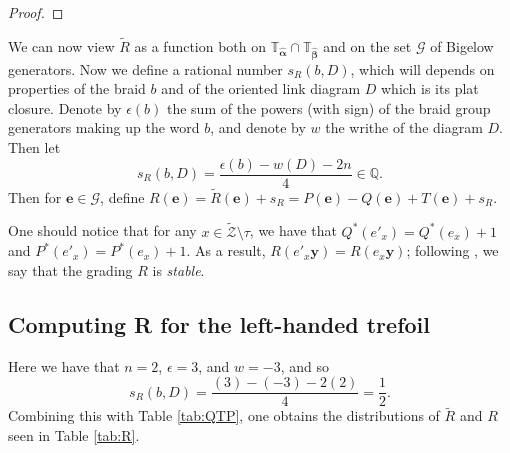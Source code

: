 \documentclass[11pt]{article}
\theoremstyle{plain} \newtheorem{thm}{Theorem}[subsection]
\theoremstyle{plain} \newtheorem{cor}[thm]{Corollary}
\theoremstyle{plain} \newtheorem{prop}[thm]{Proposition}
\theoremstyle{plain} \newtheorem{conj}[thm]{Conjecture}
\theoremstyle{plain} \newtheorem{lem}[thm]{Lemma}
\theoremstyle{definition} \newtheorem{df}[thm]{Definition}
\theoremstyle{remark} \newtheorem{rmk}[thm]{Remark}
\theoremstyle{remark} \newtheorem{obs}[thm]{Observation}
\newcommand{\Ztil}{\tld{\mathcal{Z}}}
\newcommand{\G}{\mathcal{G}}
\newcommand{\tld}[1]{\widetilde{#1}}
\newcommand{\ah}{\widehat{\alpha}}
\newcommand{\bh}{\widehat{\beta}}
\newcommand{\ba}{\boldsymbol{\alpha}}
\newcommand{\bb}{\boldsymbol{\beta}}
\newcommand{\bah}{\widehat{\ba}}
\newcommand{\bbh}{\widehat{\bb}}
\newcommand{\Tah}{\mathbb{T}_{\bah}}
\newcommand{\Tbh}{\mathbb{T}_{\bbh}}
\newcommand{\bx}{\mathbf{x}}
\newcommand{\be}{\mathbf{e}}
\newcommand{\by}{\mathbf{y}}
\begin{document}
\begin{proof}

\end{proof}

We can now view $\tld{R}$ as a function both on $\Tah \cap \Tbh$ and on the set $\G$ of Bigelow generators.  Now we define a rational number $s_{R}(b,D)$, which will depends on properties of the braid $b$ and of the oriented link diagram $D$ which is its plat closure. Denote by $\epsilon(b)$ the sum of the powers (with sign) of the braid group generators making up the word $b$, and denote by $w$ the writhe of the diagram $D$.  Then let
\begin{equation*}
s_{R}(b,D) = \frac{\epsilon(b) - w(D) - 2n}{4} \in \mathbb{Q}.
\end{equation*}
Then for $\be \in \G$, define $R(\be) = \tld{R}(\be) + s_{R} =  P(\be) - Q(\be) + T(\be) + s_{R}$.

One should notice that for any $x \in \Ztil \setminus\tau$, we have that $Q^{*}(e'_{x}) = Q^{*}(e_{x}) + 1$ and $ P^{*}(e'_{x}) =  P^{*}(e_{x}) + 1$.  As a result, $R(e'_{x}\by) = R(e_{x}\by)$; following \cite{cm:R}, we say that the grading $R$ is \emph{stable}.

\subsection{Computing R for the left-handed trefoil}\label{sec:Rdef}

Here we have that $n=2$, $\epsilon = 3$, and $w = -3$, and so
\begin{equation*}
s_{R}(b,D) = \frac{(3) - (-3) - 2(2)}{4} = \frac{1}{2}.
\end{equation*}
Combining this with Table \ref{tab:QTP}, one obtains the distributions of $\tld{R}$ and $R$ seen in Table \ref{tab:R}.
\end{document}
